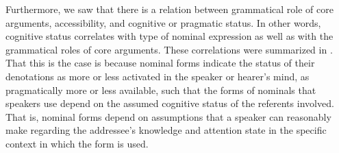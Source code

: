 Furthermore, we saw that there is a relation between grammatical role of core arguments, accessibility, and cognitive or pragmatic status. In other words, cognitive status correlates with type of nominal expression as well as with the grammatical roles of core arguments. These correlations were summarized in . That this is the case is because nominal forms indicate the status of their denotations as more or less activated in the speaker or hearer's mind, as pragmatically more or less available, such that the forms of nominals that speakers use depend on the assumed cognitive status of the referents involved. That is, nominal forms depend on assumptions that a speaker can reasonably make regarding the addressee's knowledge and attention state in the specific context in which the form is used. 


